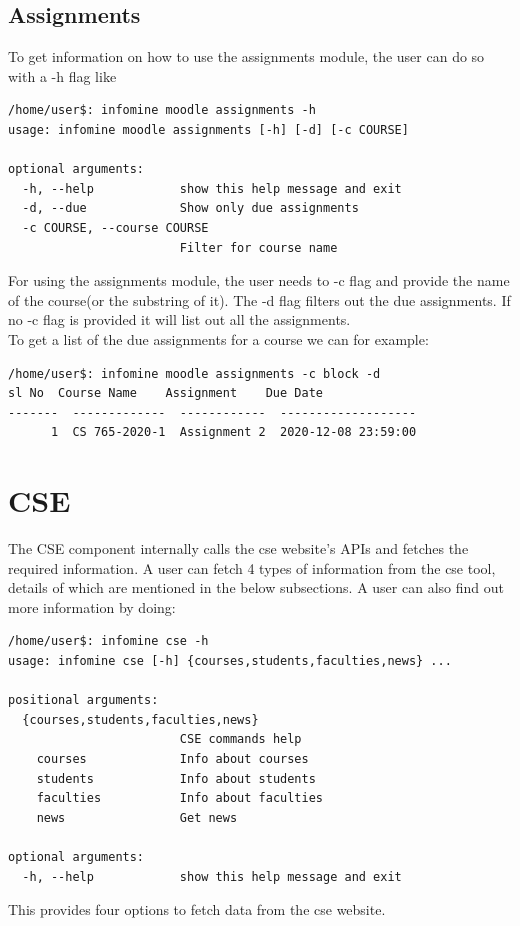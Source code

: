 \documentclass[12pt, a4paper]{article}
\begin{document}
\subsection{Assignments}
To get information on how to use the assignments module, the user can do so with a -h flag like 
\begin{verbatim}
/home/user$: infomine moodle assignments -h
usage: infomine moodle assignments [-h] [-d] [-c COURSE]

optional arguments:
  -h, --help            show this help message and exit
  -d, --due             Show only due assignments
  -c COURSE, --course COURSE
                        Filter for course name
\end{verbatim}
For using the assignments module, the user needs to -c flag and provide the name of the course(or the substring of it). The -d flag filters out the due assignments. If no -c flag is provided it will list out all the assignments.\\
To get a list of the due assignments for a course we can for example:
\begin{verbatim}
/home/user$: infomine moodle assignments -c block -d
sl No  Course Name    Assignment    Due Date
-------  -------------  ------------  -------------------
      1  CS 765-2020-1  Assignment 2  2020-12-08 23:59:00
\end{verbatim}

\section{CSE}
The CSE component internally calls the cse website's APIs and fetches the required information. 
A user can fetch 4 types of information from the cse tool, details of which are mentioned in the below subsections.
A user can also find out more information by doing:
\begin{verbatim}
/home/user$: infomine cse -h
usage: infomine cse [-h] {courses,students,faculties,news} ...

positional arguments:
  {courses,students,faculties,news}
                        CSE commands help
    courses             Info about courses
    students            Info about students
    faculties           Info about faculties
    news                Get news

optional arguments:
  -h, --help            show this help message and exit    
\end{verbatim}
This provides four options to fetch data from the cse website.
\end{document}
